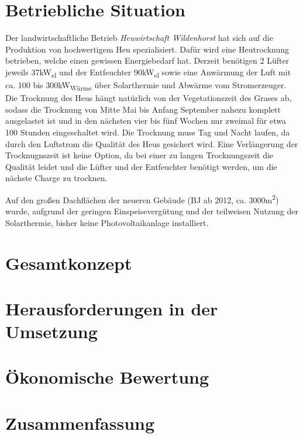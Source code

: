 \documentclass[11pt]{scrartcl}
\begin{document}
\section{Betriebliche Situation}

Der landwirtschaftliche Betrieb \textit{Heuwirtschaft Wildenhorst} hat sich auf die Produktion von hochwertigem Heu spezialisiert.
Dafür wird eine Heutrocknung betrieben, welche einen gewissen Energiebedarf hat.
Derzeit benötigen 2 Lüfter jeweils 37kW\textsubscript{el} und der Entfeuchter 90kW\textsubscript{el} sowie eine Anwärmung der Luft mit ca. 100 bis 300kW\textsubscript{Wärme} über Solarthermie und Abwärme vom Stromerzeuger.
Die Trocknung des Heus hängt natürlich von der Vegetationszeit des Grases ab, sodass die Trocknung von Mitte Mai bis Anfang September nahezu komplett ausgelastet ist und in den nächsten vier bis fünf Wochen nur zweimal für etwa 100 Stunden eingeschaltet wird.
Die Trocknung muss Tag und Nacht laufen, da durch den Luftstrom die Qualität des Heus gesichert wird.
Eine Verlängerung der Trocknugnszeit ist keine Option, da bei einer zu langen Trocknungszeit die Qualität leidet und die Lüfter und der Entfeuchter benötigt werden, um die nächste Charge zu trocknen.

Auf den großen Dachflächen der neueren Gebäude (BJ ab 2012, ca. 3000m\textsuperscript{2}) wurde, aufgrund der geringen Einspeisevergütung und der teilweisen Nutzung der Solarthermie, bisher keine Photovoltaikanlage installiert.


\section{Gesamtkonzept}
\Blindtext

\section{Herausforderungen in der Umsetzung}
\Blindtext

\section{Ökonomische Bewertung}
\Blindtext

\section{Zusammenfassung}
\Blindtext
\end{document}
